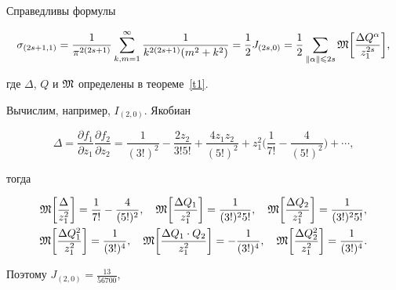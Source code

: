 \begin{cor}\label{c3} 


Справедливы формулы


\begin{equation*} %


\sigma_{(2s+1,1)}=\frac 1{\pi^{2(2s+1)}}


\sum_{k,m=1}^\infty \frac 1{k^{2(2s+1)}


(m^2+k^2)}=\frac 12 J_{(2s,0)}=\frac 12\sum_{\|\alpha\|\leqslant 2s}


\frak M\bigg[\frac{\Delta Q^\alpha}{z_1^{2s}}\bigg],


\end{equation*}


где $\Delta$, $Q$ и $\frak M$ определены в теореме~\ref{t1}.


\end{cor}





Вычислим, например, $I_{(2,0)}$. Якобиан


$$


\Delta=\frac{\partial f_1}{\partial z_1}


\frac{\partial f_2}{\partial z_2}=\frac 1{(3!)^2}-\frac{2z_2}{3!5!}


+\frac{4z_1z_2}{(5!)^2}+ z_1^2


\bigg(\frac 1{7!}-\frac 4{(5!)^2}\bigg)+\dotsb,


$$


тогда


\begin{gather*}


\frak M\bigg[\frac\Delta{z_1^2}\bigg]=\frac 1{7!}-\frac 4{(5!)^2},\quad


\frak M\bigg[\frac{\Delta Q_1}{z_1^2}\bigg]=\frac 1{(3!)^25!},\quad


\frak M\bigg[\frac{\Delta Q_2}{z_1^2}\bigg]=\frac 1{(3!)^25!}, \\


%


\frak M\bigg[\frac{\Delta Q_1^2}{z_1^2}\bigg]= \frac 1{(3!)^4},\quad


\frak M\bigg[\frac{\Delta Q_1\cdot Q_2}{z_1^2}\bigg]=-\frac 1{(3!)^4},\quad


\frak M\bigg[\frac{\Delta Q_2^2}{z_1^2}\bigg]=\frac 1{(3!)^4}.


\end{gather*}


Поэтому  $J_{(2,0)}=\frac{13}{56700}$,


